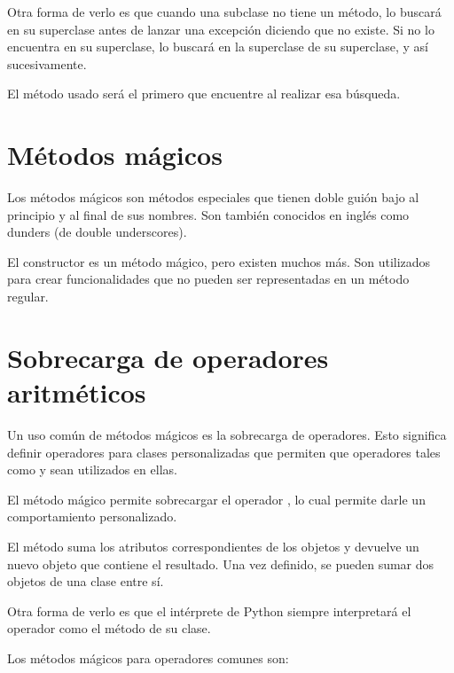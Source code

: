 
Otra forma de verlo es que cuando una subclase no tiene un método, lo buscará en su superclase antes de lanzar una excepción diciendo que no existe.
Si no lo encuentra en su superclase, lo buscará en la superclase de su superclase, y así sucesivamente.

El método usado será el primero que encuentre al realizar esa búsqueda.

\section{Métodos mágicos}

Los métodos mágicos son métodos especiales que tienen doble guión bajo al principio y al final de sus nombres.
Son también conocidos en inglés como dunders (de double underscores).

El constructor  es un método mágico, pero existen muchos más.
Son utilizados para crear funcionalidades que no pueden ser representadas en un método regular.

\section{Sobrecarga de operadores aritméticos}

Un uso común de métodos mágicos es la sobrecarga de operadores.
Esto significa definir operadores para clases personalizadas que permiten que operadores tales como \ttt{+} y \ttt{*} sean utilizados en ellas.

El método mágico  permite sobrecargar el operador \ttt{+}, lo cual permite darle un comportamiento personalizado.


El método  suma los atributos correspondientes de los objetos y devuelve un nuevo objeto que contiene el resultado.
Una vez definido, se pueden sumar dos objetos de una clase entre sí.

Otra forma de verlo es que el intérprete de Python siempre interpretará el operador \ttt{+} como el método  de su clase.

Los métodos mágicos para operadores comunes son:


